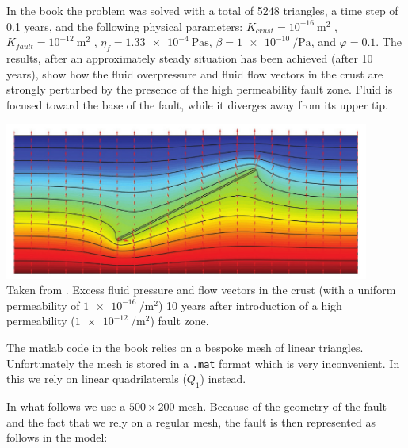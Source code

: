 In the book the problem was solved with a total of 5248 triangles, 
a time step of 0.1 years, and the following physical parameters:
$K_{crust}=10^{-16}~\si{\square\meter}$ , 
$K_{fault}=10^{-12}~\si{\square\meter}$ , 
$\eta_f  = \SI{1.33e-4}{\pascal\second}$, 
$\beta=\SI{1e-10}{\per\pascal}$, and $\varphi=0.1$. 
The results, after an approximately steady situation has been achieved (after 10 years), show how the fluid overpressure
and fluid flow vectors in the crust are strongly perturbed by the presence of the high permeability
fault zone. Fluid is focused toward the base of the fault, while it diverges away from its upper tip.
\begin{center}
\includegraphics[width=12cm]{python_codes/fieldstone_128/images/simpson2}\\
{\captionfont Taken from \cite{simp17}. Excess fluid pressure and flow vectors in the crust 
(with a uniform permeability of $\SI{1e-16}{\per\square\meter}$) 10 years after
introduction of a high permeability ($\SI{1e-12}{\per\square\meter}$) fault zone.}
\end{center}

The matlab code in the book relies on a bespoke mesh of linear triangles. Unfortunately the 
mesh is stored in a {\tt .mat} format which is very inconvenient. In this \stone we rely on 
linear quadrilaterals ($Q_1$) instead. 

In what follows we use a $500\times 200$ mesh. Because of the geometry of the fault and the fact that we rely on 
a regular mesh, the fault is then represented as follows in the model:

